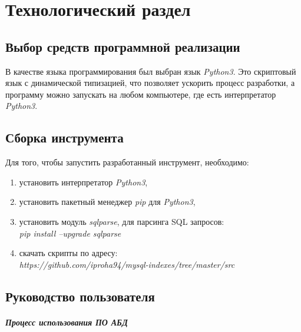 \chapter{Технологический раздел}

\section{Выбор средств программной реализации}

В качестве языка программирования был выбран язык \textit{Python3}. Это скриптовый язык с динамической типизацией, что позволяет ускорить процесс разработки, а программу можно запускать на любом компьютере, где есть интерпретатор \textit{Python3}.

\section{Сборка инструмента}

Для того, чтобы запустить разработанный инструмент, необходимо:
\begin{enumerate}
\item установить интерпретатор \textit{Python3},

\item установить пакетный менеджер \textit{pip} для \textit{Python3},

\item установить модуль \textit{sqlparse}, для парсинга SQL запросов: \\\textit{pip install --upgrade sqlparse}

\item скачать скрипты по адресу:\\ \textit{https://github.com/iproha94/mysql-indexes/tree/master/src}
\end{enumerate}

\section{Руководство пользователя}

\paragraph{Процесс использования ПО АБД}

